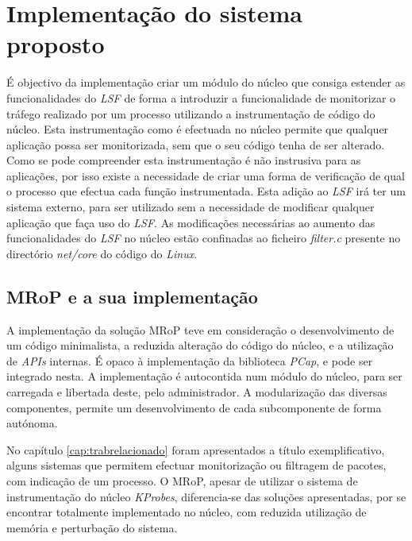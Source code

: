 \chapter{Implementação do sistema proposto}
\label{cap:Implementacao}




É objectivo da implementação criar um módulo do núcleo que consiga estender as funcionalidades do \textit{LSF} de forma a introduzir a funcionalidade de monitorizar o tráfego realizado por um processo utilizando a instrumentação de código do núcleo.
Esta instrumentação como é efectuada no núcleo permite que qualquer aplicação possa ser monitorizada, sem que o seu código tenha de ser alterado.
Como se pode compreender esta instrumentação é não instrusiva para as aplicações, por isso existe a necessidade de criar uma forma de verificação de qual o processo que efectua cada função instrumentada.
Esta adição ao \textit{LSF} irá ter um sistema externo, para ser utilizado sem a necessidade de modificar qualquer aplicação que faça uso do \textit{LSF}.
As modificações necessárias ao aumento das funcionalidades do \textit{LSF} no núcleo estão confinadas ao ficheiro \textit{filter.c} presente no directório \textit{net/core} do código do \textit{Linux}.

\section{MRoP e a sua implementação}
\label{sec:mrop_implementation}

A implementação da solução MRoP teve em consideração o desenvolvimento de um código minimalista, a reduzida alteração do código do núcleo, e a utilização de \textit{APIs} internas.
É opaco à implementação da biblioteca \textit{PCap}, e pode ser integrado nesta.
A implementação é autocontida num módulo do núcleo, para ser carregada e libertada deste, pelo administrador.
A modularização das diversas componentes, permite um desenvolvimento de cada subcomponente de forma autónoma.

No capítulo \ref{cap:trabrelacionado} foram apresentados a título exemplificativo, alguns sistemas que permitem efectuar monitorização ou filtragem de pacotes, com indicação de um processo.
O MRoP, apesar de utilizar o sistema de instrumentação do núcleo \textit{KProbes}, diferencia-se das soluções apresentadas, por se encontrar totalmente implementado no núcleo, com reduzida utilização de memória e perturbação do sistema.

